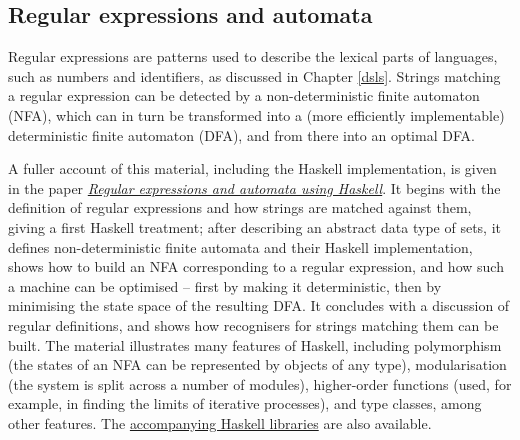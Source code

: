 \subsection*{Regular expressions and automata}
\label{RegExpsApp}

Regular expressions are patterns used to describe the lexical parts of languages, such as numbers and identifiers, as discussed in Chapter \ref{dsls}. Strings matching a regular expression can be detected by a non-deterministic finite automaton (NFA), which can in turn be transformed into a (more efficiently implementable) deterministic finite automaton (DFA), and from there into an optimal DFA.

A fuller account of this material, including the Haskell implementation, is given in the paper \href{http://www.cs.kent.ac.uk/people/staff/sjt/craft2e/regExp.pdf}{\emph{Regular expressions and automata using Haskell}}. It begins with the definition of regular expressions and how strings are matched against them, giving a first Haskell treatment; after describing an abstract data type of sets, it defines non-deterministic finite automata and their Haskell implementation, shows how to build an NFA corresponding to a regular expression, and how such a machine can be optimised -- first by making it deterministic, then by minimising the state space of the resulting DFA. It concludes with a discussion of regular definitions, and shows how recognisers for strings matching them can be built. The material illustrates many features of Haskell, including polymorphism (the states of an NFA can be represented by objects of any type), modularisation (the system is split across a number of modules), higher-order functions (used, for example, in finding the limits of iterative processes), and type classes, among other features. The \href{http://www.cs.kent.ac.uk/people/staff/sjt/craft2e/regExp.tar.gz}{accompanying Haskell libraries} are also available.

